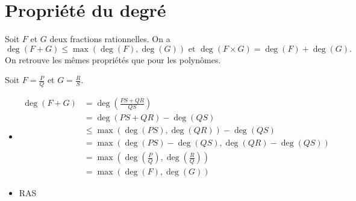 \documentclass[../main.tex]{subfiles}
\begin{document}
\section{Propriété du degré}
\begin{tcolorbox}[title=Théorème 17.13, title filled=false, colframe=orange, colback=orange!10!white]
    Soit $F$ et $G$ deux fractions rationnelles. On a
    $$\deg(F + G) \leq \max(\deg(F), \deg(G)) \text{ et } \deg(F \times G) = \deg(F) + \deg(G).$$
    On retrouve les mêmes propriétés que pour les polynômes. 
\end{tcolorbox}

\noindent Soit $F = \frac{P}{Q}$ et $G = \frac{R}{S}$. 
\begin{itemize}
    \item \begin{align*}
        \deg(F + G) &= \deg(\frac{PS + QR}{QS}) \\
        &= \deg(PS + QR) - \deg(QS) \\
        &\leq \max(\deg(PS), \deg(QR)) - \deg(QS) \\
        &= \max(\deg(PS) - \deg(QS), \deg(QR) - \deg(QS)) \\
        &= \max\left(\deg \left(\frac{P}{Q}\right), \deg \left(\frac{R}{Q}\right)\right) \\
        &= \max(\deg(F), \deg(G))
    \end{align*}

    \item RAS
\end{itemize}
\end{document}
